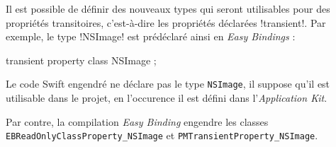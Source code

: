 

Il est possible de définir des nouveaux types qui seront utilisables pour des propriétés transitoires, c'est-à-dire les propriétés déclarées \eb!transient!. Par exemple, le type \eb!NSImage! est prédéclaré ainsi en \emph{Easy Bindings} :
\begin{ebcode}
transient property class NSImage ;
\end{ebcode}

Le code Swift engendré ne déclare pas le type \texttt{NSImage}, il suppose qu'il est utilisable dans le projet, en l'occurence il est défini dans l'\emph{Application Kit}. 

Par contre, la compilation \emph{Easy Binding} engendre les classes \texttt{EBReadOnlyClassProperty\_NSImage} et \texttt{PMTransientProperty\_NSImage}.



